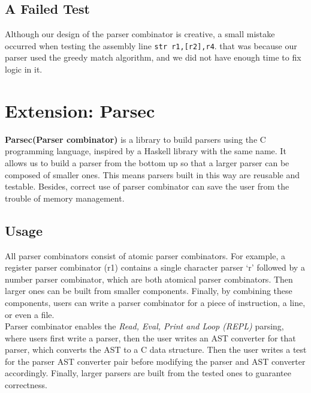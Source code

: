 \documentclass{article}
\begin{document}
\subsection{A Failed Test}
Although our design of the parser combinator is creative, a small mistake occurred when testing the assembly line \texttt{str r1,[r2],r4}. that was because our parser used the greedy match algorithm, and we did not have enough time to fix logic in it. 
\section{Extension: Parsec}
\textbf{Parsec(Parser combinator)} is a library to build parsers using the C programming language, inspired by a Haskell library with the same name.
It allows us to build a parser from the bottom up so that a larger parser can be composed of smaller ones. This means parsers built in this way are reusable and testable. Besides, correct use of parser combinator can save the user from the trouble of memory management.

\subsection{Usage}
All parser combinators consist of atomic parser combinators. For example, a register parser combinator (r1) contains a single character parser ‘r’ followed by a number parser combinator, which are both atomical parser combinators. Then larger ones can be built from smaller components. Finally, by combining these components, users can write a parser combinator for a piece of instruction, a line, or even a file.\\
Parser combinator enables the \textit{Read, Eval, Print and Loop (REPL)} parsing, where users first write a parser, then the user writes an AST converter for that parser, which converts the AST to a C data structure. Then the user writes a test for the parser AST converter pair before modifying the parser and AST converter accordingly.
Finally, larger parsers are built from the tested ones to guarantee correctness.
\end{document}
